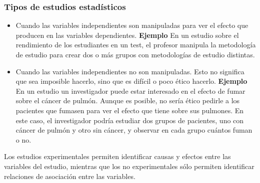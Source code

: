 \begin{frame}
\frametitle{Tipos de estudios estadísticos}
\begin{itemize}
\item {} Cuando las variables independientes son manipuladas para ver el efecto que producen en las variables dependientes.\newline
\textbf{Ejemplo} En un estudio sobre el rendimiento de los estudiantes en un test, el profesor manipula la metodología de estudio para crear dos o más grupos con metodologías de estudio distintas.
\item {} Cuando las variables independientes no son manipuladas.
Esto no significa que sea imposible hacerlo, sino que es difícil o poco ético hacerlo.\newline
\textbf{Ejemplo} En un estudio un investigador puede estar interesado en el efecto de fumar sobre el cáncer de pulmón.
Aunque es posible, no sería ético pedirle a los pacientes que fumasen para ver el efecto que tiene sobre sus pulmones.
En este caso, el investigador podría estudiar dos grupos de pacientes, uno con cáncer de pulmón y otro sin cáncer, y observar en cada grupo cuántos fuman o no.
\end{itemize}

Los estudios experimentales permiten identificar causas y efectos entre las variables del estudio, mientras que los no experimentales sólo permiten identificar relaciones de asociación entre las variables.
\end{frame}


